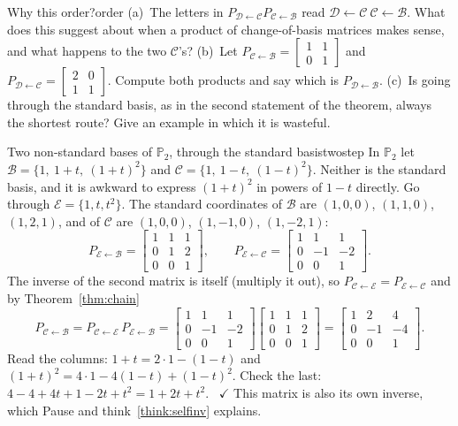 \documentclass[11pt]{article}
\begin{document}
\begin{think}{Why this order?}{order}
(a)~The letters in $P_{\mathcal{D}\leftarrow\mathcal{C}}P_{\mathcal{C}\leftarrow\mathcal{B}}$ read $\mathcal{D}\leftarrow\mathcal{C}\ \mathcal{C}\leftarrow\mathcal{B}$. What does this suggest about when a product of change-of-basis matrices makes sense, and what happens to the two $\mathcal{C}$'s? (b)~Let $P_{\mathcal{C}\leftarrow\mathcal{B}}=\begin{bmatrix}1&1\\0&1\end{bmatrix}$ and $P_{\mathcal{D}\leftarrow\mathcal{C}}=\begin{bmatrix}2&0\\1&1\end{bmatrix}$. Compute both products and say which is $P_{\mathcal{D}\leftarrow\mathcal{B}}$. (c)~Is going through the standard basis, as in the second statement of the theorem, always the shortest route? Give an example in which it is wasteful.
\end{think}

\begin{exmp}{Two non-standard bases of $\mathbb{P}_2$, through the standard basis}{twostep}
In $\mathbb{P}_2$ let $\mathcal{B}=\{1,\ 1+t,\ (1+t)^2\}$ and $\mathcal{C}=\{1,\ 1-t,\ (1-t)^2\}$. Neither is the standard basis, and it is awkward to express $(1+t)^2$ in powers of $1-t$ directly. Go through $\mathcal{E}=\{1,t,t^2\}$. The standard coordinates of $\mathcal{B}$ are $(1,0,0)$, $(1,1,0)$, $(1,2,1)$, and of $\mathcal{C}$ are $(1,0,0)$, $(1,-1,0)$, $(1,-2,1)$:
\[
P_{\mathcal{E}\leftarrow\mathcal{B}}=\begin{bmatrix}1&1&1\\0&1&2\\0&0&1\end{bmatrix},\qquad P_{\mathcal{E}\leftarrow\mathcal{C}}=\begin{bmatrix}1&1&1\\0&-1&-2\\0&0&1\end{bmatrix}.
\]
The inverse of the second matrix is itself (multiply it out), so $P_{\mathcal{C}\leftarrow\mathcal{E}}=P_{\mathcal{E}\leftarrow\mathcal{C}}$ and by Theorem~\ref{thm:chain}
\[
P_{\mathcal{C}\leftarrow\mathcal{B}}=P_{\mathcal{C}\leftarrow\mathcal{E}}\,P_{\mathcal{E}\leftarrow\mathcal{B}}=\begin{bmatrix}1&1&1\\0&-1&-2\\0&0&1\end{bmatrix}\begin{bmatrix}1&1&1\\0&1&2\\0&0&1\end{bmatrix}=\begin{bmatrix}1&2&4\\0&-1&-4\\0&0&1\end{bmatrix}.
\]
Read the columns: $1+t=2\cdot1-(1-t)$ and $(1+t)^2=4\cdot1-4(1-t)+(1-t)^2$. Check the last: $4-4+4t+1-2t+t^2=1+2t+t^2$. \ $\checkmark$ This matrix is also its own inverse, which Pause and think~\ref{think:selfinv} explains.
\end{exmp}
\end{document}
